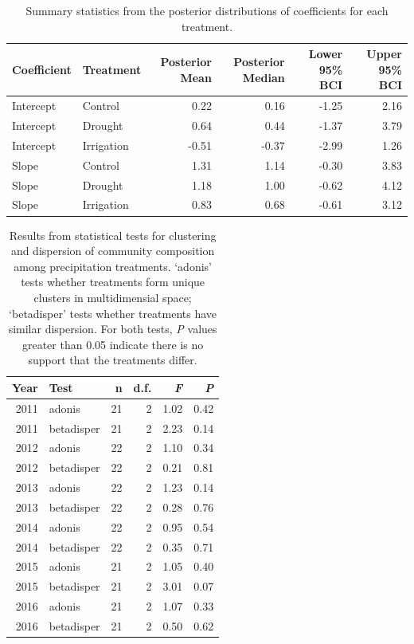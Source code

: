 \documentclass[fleqn,10pt,lineno]{wlpeerj} %
\begin{document}
\begin{table}[ht]
\centering
\caption{Summary statistics from the posterior distributions of coefficients for each treatment.} 
\begingroup\normalsize
\begin{tabular}{llrrrr}
  \hline
Coefficient & Treatment & Posterior Mean & Posterior Median & Lower 95\% BCI & Upper 95\% BCI \\ 
  \hline
Intercept & Control & 0.22 & 0.16 & -1.25 & 2.16 \\ 
  Intercept & Drought & 0.64 & 0.44 & -1.37 & 3.79 \\ 
  Intercept & Irrigation & -0.51 & -0.37 & -2.99 & 1.26 \\ 
  Slope & Control & 1.31 & 1.14 & -0.30 & 3.83 \\ 
  Slope & Drought & 1.18 & 1.00 & -0.62 & 4.12 \\ 
  Slope & Irrigation & 0.83 & 0.68 & -0.61 & 3.12 \\ 
   \hline
\end{tabular}
\endgroup
\end{table}\begin{table}[ht]
\centering
\caption{Results from statistical tests for clustering and dispersion of community composition among precipitation treatments. `adonis' tests whether treatments form unique clusters in multidimensial space; `betadisper' tests whether treatments have similar dispersion. For both tests, \emph{P} values greater than 0.05 indicate there is no support that the treatments differ.} 
\begingroup\normalsize
\begin{tabular}{rlrrrr}
  \hline
Year & Test & n & d.f. & \emph{F} & \emph{P} \\ 
  \hline
2011 & adonis &  21 &   2 & 1.02 & 0.42 \\ 
  2011 & betadisper &  21 &   2 & 2.23 & 0.14 \\ 
  2012 & adonis &  22 &   2 & 1.10 & 0.34 \\ 
  2012 & betadisper &  22 &   2 & 0.21 & 0.81 \\ 
  2013 & adonis &  22 &   2 & 1.23 & 0.14 \\ 
  2013 & betadisper &  22 &   2 & 0.28 & 0.76 \\ 
  2014 & adonis &  22 &   2 & 0.95 & 0.54 \\ 
  2014 & betadisper &  22 &   2 & 0.35 & 0.71 \\ 
  2015 & adonis &  21 &   2 & 1.05 & 0.40 \\ 
  2015 & betadisper &  21 &   2 & 3.01 & 0.07 \\ 
  2016 & adonis &  21 &   2 & 1.07 & 0.33 \\ 
  2016 & betadisper &  21 &   2 & 0.50 & 0.62 \\ 
   \hline
\end{tabular}
\endgroup
\end{table}
\end{document}
